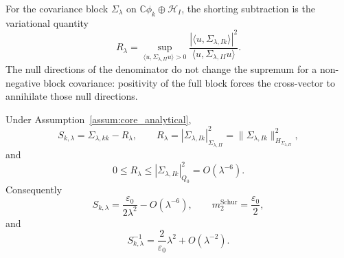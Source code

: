 For the covariance block $\Sigma_\lambda$ on
$\mathbb{C}\phi_k\oplus\mathcal{H}_I$, the shorting subtraction is the
variational quantity
\begin{equation}
 R_\lambda
 =
 \sup_{\langle u,\Sigma_{\lambda,II}u\rangle>0}
 \frac{|\langle u,\Sigma_{\lambda,Ik}\rangle|^2}
      {\langle u,\Sigma_{\lambda,II}u\rangle}.
 \label{eq:schur_variational}
\end{equation}
The null directions of the denominator do not change the supremum for a
non-negative block covariance: positivity of the full block forces the
cross-vector to annihilate those null directions.

\begin{proposition}
\label{prop:rank_one_shorted_residual}
Under Assumption~\ref{assum:core_analytical},
\begin{equation}
  S_{k,\lambda}
  =\Sigma_{\lambda,kk}-R_\lambda,
  \qquad
  R_\lambda
  =|\Sigma_{\lambda,Ik}|_{\Sigma_{\lambda,II}}^2
  =\|\Sigma_{\lambda,Ik}\|_{H_{\Sigma_{\lambda,II}}}^2,
  \label{eq:shorting_residual_energy_identity}
\end{equation}
and
\begin{equation}
  0\le R_\lambda
  \le |\Sigma_{\lambda,Ik}|_{Q_0}^2
  =O(\lambda^{-6}).
  \label{eq:shorted_residual_bound}
\end{equation}
Consequently
\begin{equation}
  S_{k,\lambda}
  =
  \frac{\varepsilon_0}{2\lambda^2}-O(\lambda^{-6}),
  \qquad
  m_2^{\mathrm{Schur}}=\frac{\varepsilon_0}{2},
  \label{eq:Schur_asympt}
\end{equation}
and
\[
  S_{k,\lambda}^{-1}
  =
  \frac{2}{\varepsilon_0}\lambda^2+O(\lambda^{-2}).
\]
\end{proposition}

